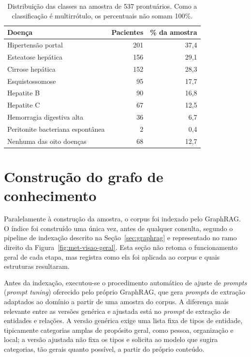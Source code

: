 \begin{table}[!htbp]
\centering
\caption{Distribuição das classes na amostra de 537 prontuários. Como a classificação é multirrótulo, os percentuais não somam 100\%.}
\label{tab:met-distribuicao}
\begin{tabular}{lrr}
\toprule
Doença & Pacientes & \% da amostra \\
\midrule
Hipertensão portal & 201 & 37,4 \\
Esteatose hepática & 156 & 29,1 \\
Cirrose hepática & 152 & 28,3 \\
Esquistossomose & 95 & 17,7 \\
Hepatite B & 90 & 16,8 \\
Hepatite C & 67 & 12,5 \\
Hemorragia digestiva alta & 36 & 6,7 \\
Peritonite bacteriana espontânea & 2 & 0,4 \\
\midrule
Nenhuma das oito doenças & 68 & 12,7 \\
\bottomrule
\end{tabular}
\par{}
\end{table}

\section{Construção do grafo de conhecimento}\label{sec:met-grafo}

Paralelamente à construção da amostra, o corpus foi indexado pelo GraphRAG. O índice foi construído uma única vez, antes de qualquer consulta, segundo o pipeline de indexação descrito na Seção~\ref{sec:graphrag} e representado no ramo direito da Figura~\ref{fig:met-visao-geral}. Esta seção não retoma o funcionamento geral de cada etapa, mas registra como ela foi aplicada ao corpus e quais estruturas resultaram.

Antes da indexação, executou-se o procedimento automático de ajuste de \textit{prompts} (\textit{prompt tuning}) oferecido pelo próprio GraphRAG, que gera \textit{prompts} de extração adaptados ao domínio a partir de uma amostra do corpus. A diferença mais relevante entre as versões genérica e ajustada está no \textit{prompt} de extração de entidades e relações. A versão genérica exige uma lista fixa de tipos de entidade, tipicamente categorias amplas de propósito geral, como pessoa, organização e local; a versão ajustada não fixa os tipos e solicita ao modelo que sugira categorias, tão gerais quanto possível, a partir do próprio conteúdo.

